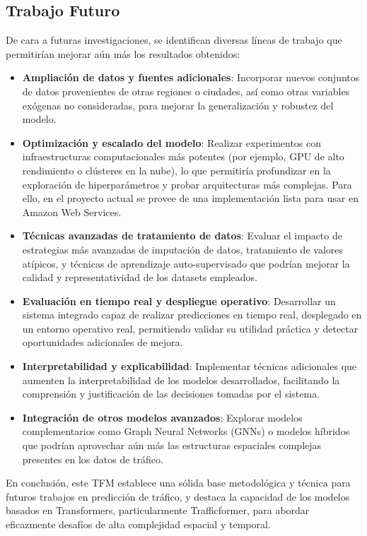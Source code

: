 \subsection{Trabajo Futuro}

De cara a futuras investigaciones, se identifican diversas líneas de trabajo que permitirían mejorar aún más los resultados obtenidos:

\begin{itemize}
	\item \textbf{Ampliación de datos y fuentes adicionales}: Incorporar nuevos conjuntos de datos provenientes de otras regiones o ciudades, así como otras variables exógenas no consideradas, para mejorar la generalización y robustez del modelo.
	\item \textbf{Optimización y escalado del modelo}: Realizar experimentos con infraestructuras computacionales más potentes (por ejemplo, GPU de alto rendimiento o clústeres en la nube), lo que permitiría profundizar en la exploración de hiperparámetros y probar arquitecturas más complejas. Para ello, en el proyecto actual se provee de una implementación lista para usar en Amazon Web Services.
	\item \textbf{Técnicas avanzadas de tratamiento de datos}: Evaluar el impacto de estrategias más avanzadas de imputación de datos, tratamiento de valores atípicos, y técnicas de aprendizaje auto-supervisado que podrían mejorar la calidad y representatividad de los datasets empleados.
	\item \textbf{Evaluación en tiempo real y despliegue operativo}: Desarrollar un sistema integrado capaz de realizar predicciones en tiempo real, desplegado en un entorno operativo real, permitiendo validar su utilidad práctica y detectar oportunidades adicionales de mejora.
	\item \textbf{Interpretabilidad y explicabilidad}: Implementar técnicas adicionales que aumenten la interpretabilidad de los modelos desarrollados, facilitando la comprensión y justificación de las decisiones tomadas por el sistema.
	\item \textbf{Integración de otros modelos avanzados}: Explorar modelos complementarios como Graph Neural Networks (GNNs) o modelos híbridos que podrían aprovechar aún más las estructuras espaciales complejas presentes en los datos de tráfico.
\end{itemize}

En conclusión, este TFM establece una sólida base metodológica y técnica para futuros trabajos en predicción de tráfico, y destaca la capacidad de los modelos basados en Transformers, particularmente Trafficformer, para abordar eficazmente desafíos de alta complejidad espacial y temporal.


